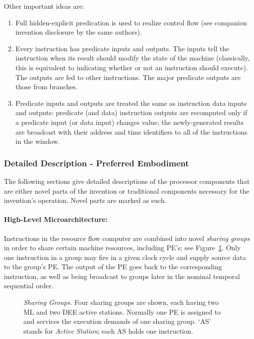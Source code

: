 \documentclass[10pt,dvips]{article}
\begin{document}
Other important ideas are:
\begin{enumerate}
\item Full hidden-explicit predication is used to realize control flow (see
companion invention disclosure by the same authors).

\item Every instruction has predicate inputs and outputs. The inputs tell the
instruction when its result should modify the state of the machine (classically,
this is equivalent to indicating whether or not an instruction should execute).
The outputs are fed to other instructions. The major predicate outputs are those
from branches.

\item Predicate inputs and outputs are treated the same as instruction data
inputs and outputs: predicate (and data) instruction outputs
are recomputed only if a predicate input (or data input) changes value; the
newly-generated results are broadcast with their address and time identifiers
to all of the instructions in the window.
\end{enumerate}

\subsubsection{Detailed Description - Preferred Embodiment}
The following sections give detailed descriptions of the processor components that
are either novel parts of the invention or traditional components
necessary for the invention's operation. Novel parts are marked as such.

\paragraph{High-Level Microarchitecture: }
Instructions in the resource flow computer are combined into novel {\it sharing groups}
in order to
share certain machine resources, including PE's; see Figure~\ref{sharinggroups}.
Only one instruction in a group may fire in a given clock cycle and supply source data
to the group's PE. The output of the PE goes back to the corresponding instruction,
as well as being broadcast to groups later in the nominal temporal sequential order.

\begin{figure}
\centering
{}
\caption{{\em Sharing Groups.} Four sharing groups are shown, each having two ML
and two DEE active stations. Normally one PE is assigned to and services the
execution demands of one sharing group. `AS' stands for {\it Active Station}; each
AS holds one instruction.}
\label{sharinggroups}
\end{figure}
\end{document}
